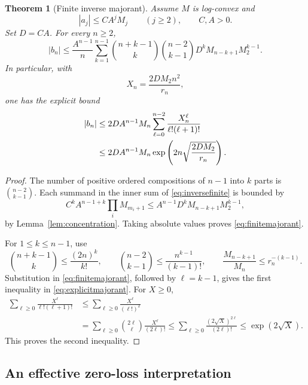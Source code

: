 \documentclass[11pt,a4paper]{article}
\numberwithin{equation}{section}
\newtheorem{theorem}{Theorem}[section]
\theoremstyle{definition}
\theoremstyle{remark}
\begin{document}
\begin{theorem}[Finite inverse majorant]
\label{thm:finite}
Assume $M$ is log-convex and
\begin{equation}
 |a_j|\le CA^jM_j\qquad(j\ge2),\qquad C,A>0.
 \label{eq:inputbound}
\end{equation}
Set $D=CA$. For every $n\ge2$,
\begin{equation}
 |b_n|\le\frac{A^{n-1}}n
 \sum_{k=1}^{n-1}\binom{n+k-1}{k}\binom{n-2}{k-1}
       D^kM_{n-k+1}M_2^{k-1}.
 \label{eq:finitemajorant}
\end{equation}
In particular, with
\begin{equation}
 X_n=\frac{2DM_2n^2}{r_n},
 \label{eq:X}
\end{equation}
one has the explicit bound
\begin{align}
 |b_n|&\le2DA^{n-1}M_n
       \sum_{\ell=0}^{n-2}\frac{X_n^\ell}{\ell!(\ell+1)!}
 \notag\\
 &\le2DA^{n-1}M_n\exp\left(2n\sqrt{\frac{2DM_2}{r_n}}\right).
 \label{eq:explicitmajorant}
\end{align}
\end{theorem}
\begin{proof}
The number of positive ordered compositions of $n-1$ into $k$ parts
is $\binom{n-2}{k-1}$. Each summand in the inner sum of
\eqref{eq:inversefinite} is bounded by
\[
 C^k A^{n-1+k}\prod_iM_{m_i+1}
 \le A^{n-1}D^kM_{n-k+1}M_2^{k-1},
\]
by Lemma~\ref{lem:concentration}. Taking absolute values proves
\eqref{eq:finitemajorant}.

For $1\le k\le n-1$, use
\[
 \binom{n+k-1}{k}\le\frac{(2n)^k}{k!},\qquad
 \binom{n-2}{k-1}\le\frac{n^{k-1}}{(k-1)!},\qquad
 \frac{M_{n-k+1}}{M_n}\le r_n^{-(k-1)}.
\]
Substitution in \eqref{eq:finitemajorant}, followed by $\ell=k-1$,
gives the first inequality in \eqref{eq:explicitmajorant}.
For $X\ge0$,
\begin{align*}
 \sum_{\ell\ge0}\frac{X^\ell}{\ell!(\ell+1)!}
 &\le\sum_{\ell\ge0}\frac{X^\ell}{(\ell!)^2}\\
 &=\sum_{\ell\ge0}\binom{2\ell}{\ell}\frac{X^\ell}{(2\ell)!}
 \le\sum_{\ell\ge0}\frac{(2\sqrt X)^{2\ell}}{(2\ell)!}
 \le\exp(2\sqrt X).
\end{align*}
This proves the second inequality.
\end{proof}

\subsection{An effective zero-loss interpretation}
\end{document}
